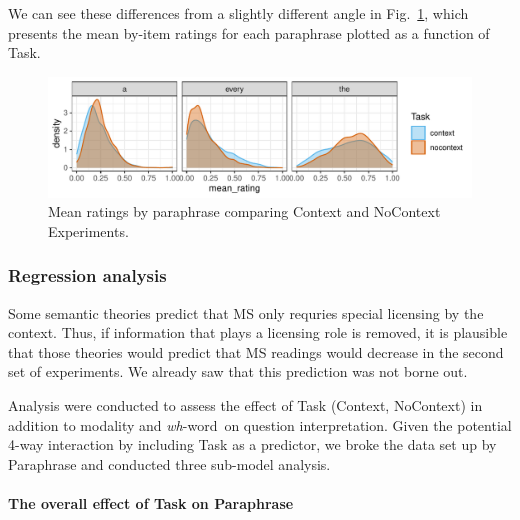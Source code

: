 \documentclass[12pt,letterpaper,table,svgnames,dvipsnames]{article}
\newcommand{\figref}[1]{Fig.~\ref{#1}}
\newcommand{\whw}{\emph{wh}-word~}
\begin{document}
We can see these differences from a slightly different angle in \figref{density_Task_overall}, which presents the mean by-item ratings for each paraphrase plotted as a function of Task. 
\begin{figure}[h!]
\centering
\centering
\includegraphics[scale=1]{figures/denisty_context_ratings.pdf}
\caption{Mean ratings by paraphrase comparing Context and NoContext Experiments.}
\label{density_Task_overall}
\end{figure}


\subsubsection{Regression analysis}
Some semantic theories predict that MS only requries special licensing by the context. Thus, if information that plays a licensing role is removed, it is plausible that those theories would predict that MS readings would decrease in the second set of experiments. We already saw that this prediction was not borne out. 

Analysis were conducted to assess the effect of Task (Context, NoContext) in addition to modality and \whw on question interpretation. Given the potential 4-way interaction by including Task as a predictor, we broke the data set up by Paraphrase and conducted three sub-model analysis.


\paragraph{The overall effect of Task on Paraphrase}
\end{document}
